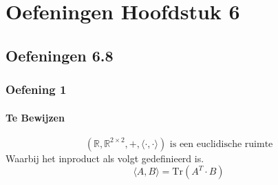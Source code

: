 \documentclass[lineaire_algebra_oplossingen.tex]{subfiles}
\begin{document}
\chapter{Oefeningen Hoofdstuk 6}

\section{Oefeningen 6.8}


\subsection{Oefening 1}
\subsubsection*{Te Bewijzen}
\[
(\mathbb{R},\mathbb{R}^{2\times 2},+,\langle \cdot,\cdot \rangle ) \text{ is een euclidische ruimte}
\]
Waarbij het inproduct als volgt gedefinieerd is.
\[
\langle A,B \rangle = \text{Tr}(A^T\cdot B)
\]
\end{document}
